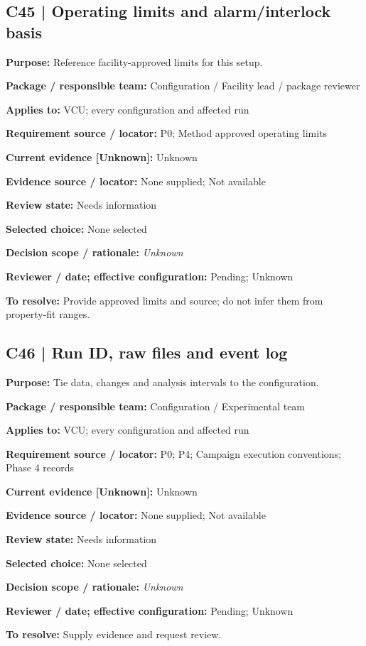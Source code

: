 \documentclass[11pt]{article}
\begin{document}
\par\noindent\begin{minipage}{\textwidth}\small\setlength{\parskip}{2pt}
\subsection*{C45 | Operating limits and alarm/interlock basis}
\textbf{Purpose:} Reference facility-approved limits for this setup.\par
\textbf{Package / responsible team:} Configuration / Facility lead / package reviewer\par
\textbf{Applies to:} VCU; every configuration and affected run\par
\textbf{Requirement source / locator:} P0; Method approved operating limits\par
\textbf{Current evidence [Unknown]:} Unknown\par
\textbf{Evidence source / locator:} None supplied; Not available\par
\textbf{Review state:} Needs information\par
\textbf{Selected choice:} None selected\par
\textbf{Decision scope / rationale:} \textit{Unknown}\par
\textbf{Reviewer / date; effective configuration:} Pending; Unknown\par
\textbf{To resolve:} Provide approved limits and source; do not infer them from property-fit ranges.\par
\end{minipage}\par\vspace{5pt}
\par\noindent\begin{minipage}{\textwidth}\small\setlength{\parskip}{2pt}
\subsection*{C46 | Run ID, raw files and event log}
\textbf{Purpose:} Tie data, changes and analysis intervals to the configuration.\par
\textbf{Package / responsible team:} Configuration / Experimental team\par
\textbf{Applies to:} VCU; every configuration and affected run\par
\textbf{Requirement source / locator:} P0; P4; Campaign execution conventions; Phase 4 records\par
\textbf{Current evidence [Unknown]:} Unknown\par
\textbf{Evidence source / locator:} None supplied; Not available\par
\textbf{Review state:} Needs information\par
\textbf{Selected choice:} None selected\par
\textbf{Decision scope / rationale:} \textit{Unknown}\par
\textbf{Reviewer / date; effective configuration:} Pending; Unknown\par
\textbf{To resolve:} Supply evidence and request review.\par
\end{minipage}\par\vspace{5pt}
\end{document}
